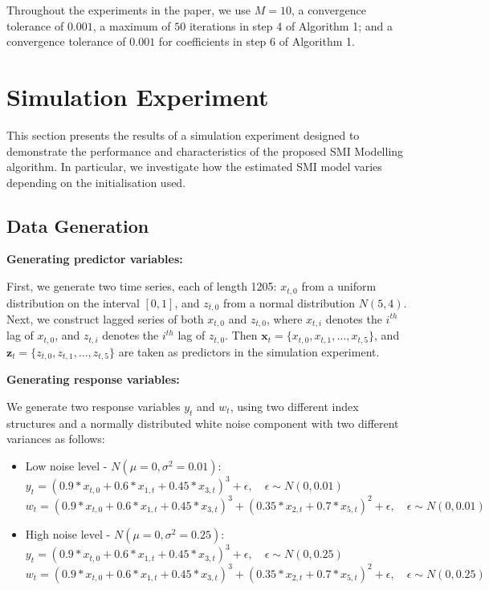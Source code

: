 \documentclass[
  11pt,
  a4paper,
]{article}
\begin{document}
Throughout the experiments in the paper, we use \(M = 10\), a
convergence tolerance of \(0.001\), a maximum of \(50\) iterations in
step 4 of Algorithm 1; and a convergence tolerance of \(0.001\) for
coefficients in step 6 of Algorithm 1.

\section{Simulation Experiment}\label{sec-simulation}

This section presents the results of a simulation experiment designed to
demonstrate the performance and characteristics of the proposed SMI
Modelling algorithm. In particular, we investigate how the estimated SMI
model varies depending on the initialisation used.

\subsection{Data Generation}\label{sec-datagen}

\textbf{Generating predictor variables:}

First, we generate two time series, each of length 1205: \(x_{t,0}\)
from a uniform distribution on the interval \([0, 1]\), and \(z_{t,0}\)
from a normal distribution \(N(5, 4)\). Next, we construct lagged series
of both \(x_{t,0}\) and \(z_{t,0}\), where \(x_{t,i}\) denotes the
\(i^{th}\) lag of \(x_{t,0}\), and \(z_{t,i}\) denotes the \(i^{th}\)
lag of \(z_{t,0}\). Then
\(\bm{x}_t = \{x_{t,0}, x_{t,1}, \dots, x_{t,5}\}\), and
\(\bm{z}_t = \{z_{t,0}, z_{t,1}, \dots, z_{t,5}\}\) are taken as
predictors in the simulation experiment.

\textbf{Generating response variables:}

We generate two response variables \(y_{t}\) and \(w_{t}\), using two
different index structures and a normally distributed white noise
component with two different variances as follows:

\begin{itemize}
\item
  Low noise level - \(N(\mu = 0, \sigma^2 = 0.01)\):\\
  \(y_{t} = (0.9*x_{t,0} + 0.6*x_{1,t} + 0.45*x_{3,t})^3 + \epsilon, \quad \epsilon\sim N(0, 0.01)\)\\
  \(w_{t} = (0.9*x_{t,0} + 0.6*x_{1,t} + 0.45*x_{3,t})^3 + (0.35*x_{2,t} + 0.7*x_{5,t})^2 + \epsilon, \quad \epsilon\sim N(0, 0.01)\)
\item
  High noise level - \(N(\mu = 0, \sigma^2 = 0.25)\):\\
  \(y_{t} = (0.9*x_{t,0} + 0.6*x_{1,t} + 0.45*x_{3,t})^3 + \epsilon, \quad \epsilon\sim N(0, 0.25)\)\\
  \(w_{t} = (0.9*x_{t,0} + 0.6*x_{1,t} + 0.45*x_{3,t})^3 + (0.35*x_{2,t} + 0.7*x_{5,t})^2 + \epsilon, \quad \epsilon\sim N(0, 0.25)\)
\end{itemize}
\end{document}
